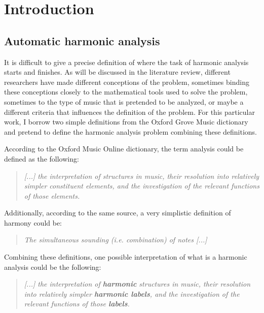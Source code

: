 \chapter{Introduction}

\section{Automatic harmonic analysis}
It is difficult to give a precise definition of where the task of harmonic analysis starts and finishes. As will be discussed in the literature review, different researchers have made different conceptions of the problem, sometimes binding these conceptions closely to the mathematical tools used to solve the problem, sometimes to the type of music that is pretended to be analyzed, or maybe a different criteria that influences the definition of the problem. For this particular work, I borrow two simple definitions from the Oxford Grove Music dictionary and pretend to define the harmonic analysis problem combining these definitions.

According to the Oxford Music Online dictionary, the term analysis could be defined as the following: \cite{oxfordanalysis}

\begin{quote}
\centering
\emph{[...] the interpretation of structures in music, \linebreak
their resolution into relatively simpler constituent elements, \linebreak and the investigation of the relevant functions of those elements.}
\end{quote}

Additionally, according to the same source, a very simplistic definition of harmony could be: \cite{oxfordharmony}

\begin{quote}
\centering
\emph{The simultaneous sounding (i.e. combination) of notes [...]}
\end{quote}

Combining these definitions, one possible interpretation of what is a harmonic analysis could be the following:

\begin{quote}
\centering
\emph{[...] the interpretation of \textbf{harmonic} structures in music, \linebreak
their resolution into relatively simpler \textbf{harmonic labels}, \linebreak and the investigation of the relevant functions of those \textbf{labels}.}
\end{quote}

